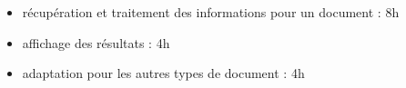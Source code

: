 		\begin{itemize}
			\item récupération et traitement des informations pour un document : 8h
			\item affichage des résultats : 4h
			\item adaptation pour les autres types de document : 4h
		\end{itemize}

